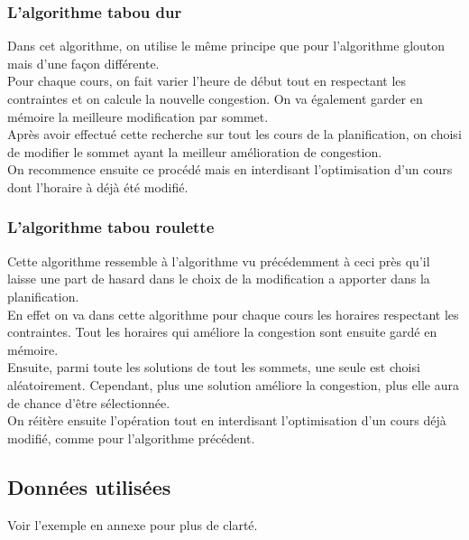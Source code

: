 \documentclass[a4paper,11pt]{article}
\begin{document}
		\subsubsection{L'algorithme tabou dur}
		Dans cet algorithme, on utilise le même principe que pour l'algorithme glouton mais d'une façon différente.\\
		Pour chaque cours, on fait varier l'heure de début tout en respectant les contraintes et on calcule la nouvelle congestion. On va également garder en mémoire la meilleure modification par sommet.\\
		Après avoir effectué cette recherche sur tout les cours de la planification, on choisi de modifier le sommet ayant la meilleur amélioration de congestion.\\
		On recommence ensuite ce procédé mais en interdisant l'optimisation d'un cours dont l'horaire à déjà été modifié.
		\subsubsection{L'algorithme tabou roulette}
		Cette algorithme ressemble à l'algorithme vu précédemment à ceci près qu'il laisse une part de hasard dans le choix de la modification a apporter dans la planification.\\
		En effet on va dans cette algorithme pour chaque cours les horaires respectant les contraintes. Tout les horaires qui améliore la congestion sont ensuite gardé en mémoire.\\
		Ensuite, parmi toute les solutions de tout les sommets, une seule est choisi aléatoirement. Cependant, plus une solution améliore la congestion, plus elle aura de chance d'être sélectionnée.\\
		On réitère ensuite l'opération tout en interdisant l'optimisation d'un cours déjà modifié, comme pour l'algorithme précédent. 
	
	\subsection{Données utilisées}
		Voir l'exemple en annexe pour plus de clarté.
\end{document}
